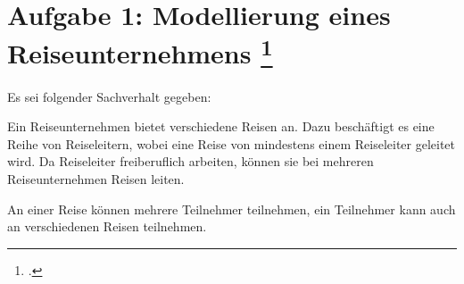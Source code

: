 \documentclass{bschlangaul-aufgabe}
\begin{document}
\section{Aufgabe 1: Modellierung eines Reiseunternehmens
\footcite{examen:46116:2010:03}}

Es sei folgender Sachverhalt gegeben:

Ein Reiseunternehmen bietet verschiedene Reisen an. Dazu beschäftigt es
eine Reihe von Reiseleitern, wobei eine Reise von mindestens einem
Reiseleiter geleitet wird. Da Reiseleiter freiberuflich arbeiten, können
sie bei mehreren Reiseunternehmen Reisen leiten.

An einer Reise können mehrere Teilnehmer teilnehmen, ein Teilnehmer kann
auch an verschiedenen Reisen teilnehmen.
\end{document}
